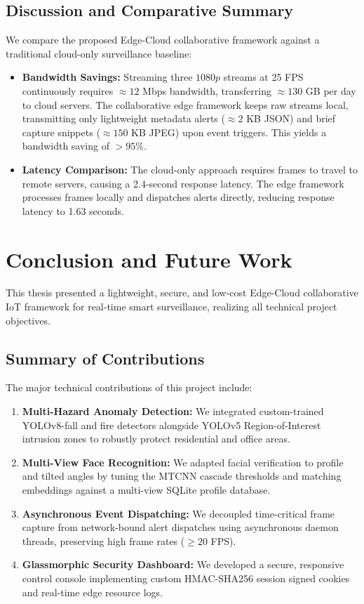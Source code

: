 \documentclass[12pt,a4paper]{article}
\begin{document}
\subsection{Discussion and Comparative Summary}
We compare the proposed Edge-Cloud collaborative framework against a traditional cloud-only surveillance baseline:
\begin{itemize}
    \item \textbf{Bandwidth Savings:} Streaming three $1080p$ streams at 25 FPS continuously requires $\approx 12$ Mbps bandwidth, transferring $\approx 130$ GB per day to cloud servers. The collaborative edge framework keeps raw streams local, transmitting only lightweight metadata alerts ($\approx 2$ KB JSON) and brief capture snippets ($\approx 150$ KB JPEG) upon event triggers. This yields a bandwidth saving of $> 95\%$.
    \item \textbf{Latency Comparison:} The cloud-only approach requires frames to travel to remote servers, causing a 2.4-second response latency. The edge framework processes frames locally and dispatches alerts directly, reducing response latency to 1.63 seconds.
\end{itemize}

\newpage

\section{Conclusion and Future Work}

This thesis presented a lightweight, secure, and low-cost Edge-Cloud collaborative IoT framework for real-time smart surveillance, realizing all technical project objectives.

\subsection{Summary of Contributions}
The major technical contributions of this project include:
\begin{enumerate}
    \item \textbf{Multi-Hazard Anomaly Detection:} We integrated custom-trained YOLOv8-fall and fire detectors alongside YOLOv5 Region-of-Interest intrusion zones to robustly protect residential and office areas.
    \item \textbf{Multi-View Face Recognition:} We adapted facial verification to profile and tilted angles by tuning the MTCNN cascade thresholds and matching embeddings against a multi-view SQLite profile database.
    \item \textbf{Asynchronous Event Dispatching:} We decoupled time-critical frame capture from network-bound alert dispatches using asynchronous daemon threads, preserving high frame rates ($\ge 20$ FPS).
    \item \textbf{Glassmorphic Security Dashboard:} We developed a secure, responsive control console implementing custom HMAC-SHA256 session signed cookies and real-time edge resource logs.
\end{enumerate}
\end{document}
